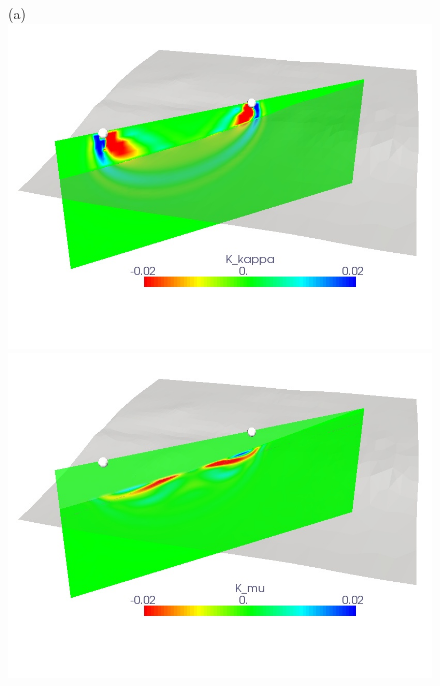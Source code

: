 \documentclass[referee,extra]{gji}
\begin{document}
\begin{figure}
\begin{center}
\begin{minipage}[t]{0.49\textwidth}
\begin{center}
(a)\\
\includegraphics[width=1.\textwidth]{./images/pearl_kappa_kernel.jpg}\\
\includegraphics[width=1.\textwidth]{./images/pearl_mu_kernel.jpg}\\

\end{center}
\end{minipage}
\end{center}
\end{figure}
\end{document}
